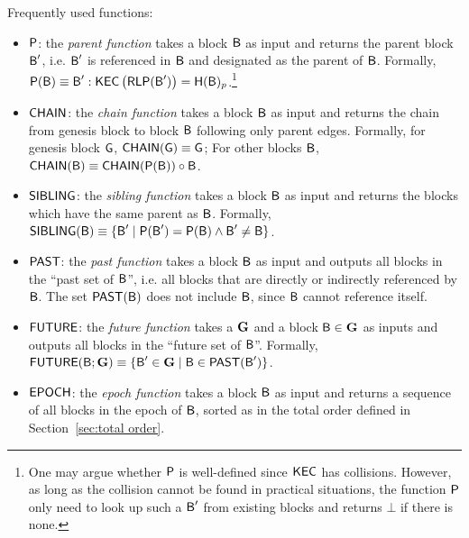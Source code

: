 Frequently used functions:
\begin{itemize}[nosep]
	\item $\mathsf{P}$: the \emph{parent function}  takes a block $\textsf{B}$ as input and returns the parent block $\textsf{B}'$, i.e. $\textsf{B}'$ is referenced in $\textsf{B}$ and designated as the parent of $\textsf{B}$.
	Formally, $\mathsf{P}(\textsf{B})\equiv \textsf{B}':\mathsf{KEC}\left(\mathsf{RLP}(\textsf{B}')\right)=\textsf{H}(\textsf{B})_{p}$.\footnote{One may argue whether $\mathsf{P}$ is well-defined since $\mathsf{KEC}$ has collisions. However, as long as the collision cannot be found in practical situations, the function $\mathsf{P}$ only need to look up such a $\textsf{B}'$ from existing blocks and returns $\bot$ if there is none.}

	\item $\mathsf{CHAIN}$: the \emph{chain function} takes a block $\textsf{B}$ as input and returns the chain from genesis block to block $\textsf{B}$ following only parent edges. Formally, for genesis block $\textsf{G}$, $\mathsf{CHAIN}(\textsf{G})\equiv\textsf{G}$; For other blocks $\textsf{B}$, $\mathsf{CHAIN}(\textsf{B})\equiv\mathsf{CHAIN}(\mathsf{P}(\textsf{B}))\circ \textsf{B}$.
	
	\item $\mathsf{SIBLING}$: the \emph{sibling function} takes a block $\textsf{B}$ as input and returns the blocks which have the same parent as $\textsf{B}$. Formally, $\mathsf{SIBLING}(\textsf{B})\equiv\{\textsf{B}' \;|\; \mathsf{P}(\textsf{B}')=\mathsf{P}(\textsf{B}) \wedge \textsf{B}'\neq \textsf{B}\}$.

	\item $\mathsf{PAST}$: the \emph{past function}  takes a block $\textsf{B}$ as input and outputs all blocks in the ``past set of $\textsf{B}$'', i.e. all blocks that are directly or indirectly referenced by $\textsf{B}$.
	The set $\mathsf{PAST}(\textsf{B})$ does not include $\textsf{B}$, since $\textsf{B}$ cannot reference itself.
	
	\item $\mathsf{FUTURE}$: the \emph{future function} takes a \tg $\textbf{G}$ and a block $\textsf{B}\in\textbf{G}$ as inputs and outputs all blocks in the  ``future set of $\textsf{B}$''. Formally, $\mathsf{FUTURE}(\textsf{B};\textbf{G})\equiv\{\textsf{B}' \in \textbf{G} \mid \textsf{B} \in \mathsf{PAST}(\textsf{B}')\}$. 

	\item $\mathsf{EPOCH} $: the \emph{epoch function} takes a block $\textsf{B}$ as input and returns a sequence of all blocks in the epoch of $\textsf{B}$, sorted as in the \name total order defined in Section~\ref{sec:total order}.



\end{itemize}
